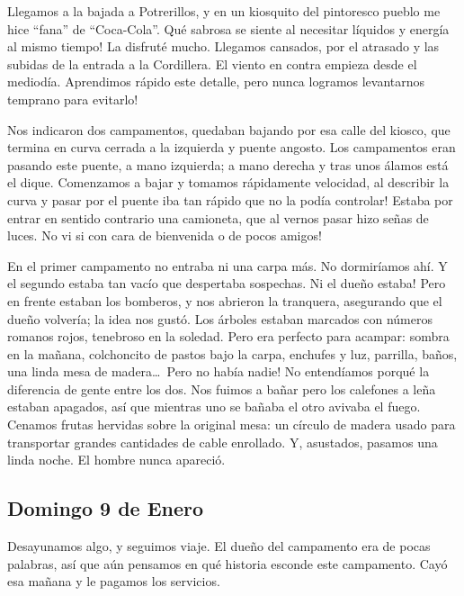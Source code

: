 Llegamos a la bajada a Potrerillos, y en un kiosquito del pintoresco pueblo me
hice ``fana'' de ``Coca-Cola''. \textexclamdown Qu\'e sabrosa se siente al
necesitar l\'iquidos y energ\'ia al mismo tiempo! La disfrut\'e mucho. Llegamos
cansados, por el atrasado y las subidas de la entrada a la Cordillera. El viento
en contra empieza desde el mediod\'ia. Aprendimos r\'apido este detalle,
\textexclamdown pero nunca logramos levantarnos temprano para evitarlo!

Nos indicaron dos campamentos, quedaban bajando por esa calle del kiosco, que
termina en curva cerrada a la izquierda y puente angosto. Los campamentos eran
pasando este puente, a mano izquierda; a mano derecha y tras unos \'alamos
est\'a el dique. Comenzamos a bajar y tomamos r\'apidamente velocidad,
\textexclamdown al describir la curva y pasar por el puente iba tan r\'apido que
no la pod\'ia controlar! Estaba por entrar en sentido contrario una camioneta,
que al vernos pasar hizo se\~nas de luces. \textexclamdown No vi si con cara de
bienvenida o de pocos amigos!

En el primer campamento no entraba ni una carpa m\'as. No dormir\'iamos ah\'i. Y
el segundo estaba tan vac\'io que despertaba sospechas. \textexclamdown Ni el
due\~no estaba! Pero en frente estaban los bomberos, y nos abrieron la
tranquera, asegurando que el due\~no volver\'ia; la idea nos gust\'o. Los
\'arboles estaban marcados con n\'umeros romanos rojos, tenebroso en la soledad.
Pero era perfecto para acampar: sombra en la ma\~nana, colchoncito de pastos
bajo la carpa, enchufes y luz, parrilla, ba\~nos, una linda mesa de
madera\ldots\ \textexclamdown Pero no hab\'ia nadie! No entend\'iamos porqu\'e
la diferencia de gente entre los dos. Nos fuimos a ba\~nar pero los calefones a
le\~na estaban apagados, as\'i que mientras uno se ba\~naba el otro avivaba el
fuego. Cenamos frutas hervidas sobre la original mesa: un c\'irculo de madera
usado para transportar grandes cantidades de cable enrollado. Y, asustados,
pasamos una linda noche. El hombre nunca apareci\'o.

\subsection*{Domingo 9 de Enero}

Desayunamos algo, y seguimos viaje. El due\~no del campamento era de pocas
palabras, as\'i que a\'un pensamos en qu\'e historia esconde este campamento.
Cay\'o esa ma\~nana y le pagamos los servicios.

